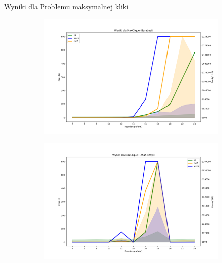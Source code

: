 \begin{frame}{Wyniki dla Problemu maksymalnej kliki}
	\begin{figure}[htbp]
		\centering
		\begin{subfigure}[b]{0.5\textwidth}
			\includegraphics[width=\textwidth]{../thesis/figures/3-barabasi-plot.png}
		\end{subfigure}
		\begin{subfigure}[b]{0.49\textwidth}
			\includegraphics[width=\textwidth]{../thesis/figures/3-erdos-renyi-plot.png}
		\end{subfigure}
	\end{figure}
\end{frame}
	